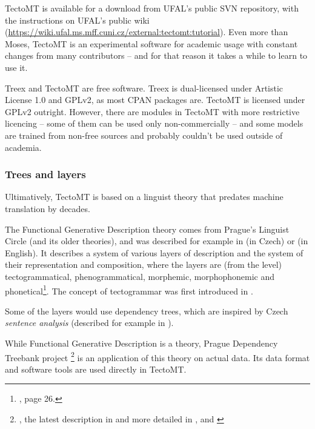 TectoMT is available for a download from UFAL's public SVN repository, with the instructions on UFAL's public wiki (\url{https://wiki.ufal.ms.mff.cuni.cz/external:tectomt:tutorial}). Even more than Moses, TectoMT is an experimental software for academic usage with constant changes from many contributors -- and for that reason it takes a while to learn to use it.

Treex and TectoMT are free software. Treex is dual-licensed under Artistic License 1.0 and GPLv2, as most CPAN packages are. TectoMT is licensed under GPLv2 outright. However, there are modules in TectoMT with more restrictive licencing -- some of them can be used only non-commercially -- and some models are trained from non-free sources and probably couldn't be used outside of academia. 


\subsubsection{Trees and layers}
Ultimatively, TectoMT is based on a linguist theory that predates machine translation by decades.

The Functional Generative Description theory comes from Prague's Linguist Circle (and its older theories), and was described for example in \cite{sgallczech} (in Czech) or \cite{sgallenglish} (in English). It describes a system of various layers of description and the system of their representation and composition, where the layers are (from the  level) tectogrammatical, phenogrammatical, morphemic, morphophonemic and phonetical\footnote{\cite{sgallenglish}, page 26.}. The concept of tectogrammar was first introduced in \cite{curry}.

Some of the layers would use dependency trees, which are inspired by Czech \emph{sentence analysis} (described for example in \cite{smilauer}).

While Functional Generative Description is a theory, Prague Dependency Treebank project \footnote{\cite{pdt_soft}, the latest description in \cite{pdt_desc} and more detailed in \cite{pdt_manual_a}, \cite{pdt_manual_m} and \cite{pdt_manual_t}} is an application of this theory on actual data. Its data format and software tools are used directly in TectoMT.

